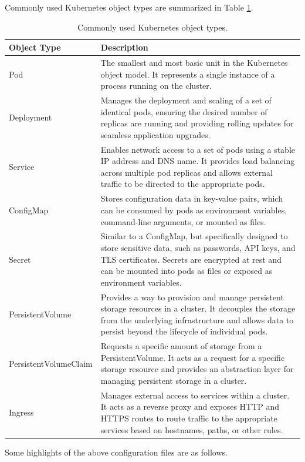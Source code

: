 Commonly used Kubernetes object types are summarized in Table \ref{ch:vac:tab:objtype}.
\begin{table}[htbp]
	\centering
	\caption{Commonly used Kubernetes object types.} \label{ch:vac:tab:objtype}
	\begin{tabularx}{\textwidth}{lX}
		\hline
		Object Type & Description \\
		\hline
		Pod & The smallest and most basic unit in the Kubernetes object model. It represents a single instance of a process running on the cluster. \\ \hdashline
		Deployment & Manages the deployment and scaling of a set of identical pods, ensuring the desired number of replicas are running and providing rolling updates for seamless application upgrades. \\ \hdashline
		Service & Enables network access to a set of pods using a stable IP address and DNS name. It provides load balancing across multiple pod replicas and allows external traffic to be directed to the appropriate pods. \\ \hdashline
		ConfigMap & Stores configuration data in key-value pairs, which can be consumed by pods as environment variables, command-line arguments, or mounted as files. \\ \hdashline
		Secret & Similar to a ConfigMap, but specifically designed to store sensitive data, such as passwords, API keys, and TLS certificates. Secrets are encrypted at rest and can be mounted into pods as files or exposed as environment variables. \\ \hdashline
		PersistentVolume & Provides a way to provision and manage persistent storage resources in a cluster. It decouples the storage from the underlying infrastructure and allows data to persist beyond the lifecycle of individual pods. \\ \hdashline
		PersistentVolumeClaim & Requests a specific amount of storage from a PersistentVolume. It acts as a request for a specific storage resource and provides an abstraction layer for managing persistent storage in a cluster. \\ \hdashline
		Ingress & Manages external access to services within a cluster. It acts as a reverse proxy and exposes HTTP and HTTPS routes to route traffic to the appropriate services based on hostnames, paths, or other rules. \\
		\hline
	\end{tabularx}
\end{table}
Some highlights of the above configuration files are as follows.
